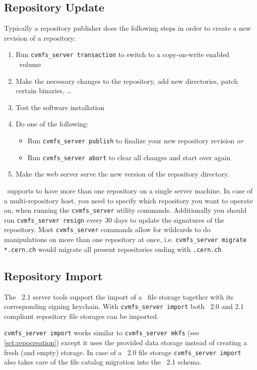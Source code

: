 \subsection{Repository Update}
\label{sct:repoupdateprocedure}
Typically a repository publisher does the following steps in order to create a new revision of a repository:
\begin{enumerate}
	\item Run \texttt{cvmfs\_server transaction} to switch to a copy-on-write enabled \cvmfs\ volume
	\item Make the necessary changes to the repository, \eg add new directories, patch certain binaries, \dots
	\item Test the software installation
	\item Do one of the following:
	\begin{itemize}
		\item Run \texttt{cvmfs\_server publish} to finalize your new repository revision \emph{or}
		\item Run \texttt{cvmfs\_server abort} to clear all changes and start over again
	\end{itemize}
	\item Make the web server serve the new version of the repository directory.
\end{enumerate}

\cvmfs\ supports to have more than one repository on a single server machine.
In case of a multi-repository host, you need to specify which repository you want to operate on, when running the \texttt{cvmfs\_server} utility commands.
Additionally you should run \texttt{cvmfs\_server resign} every 30 days to update the signatures of the repository.
Most \texttt{cvmfs\_server} commands allow for wildcards to do manipulations on more than one repository at once, i.e. \texttt{cvmfs\_server migrate *.cern.ch} would migrate all present repositories ending with \texttt{.cern.ch}.

\subsection{Repository Import}
The \cvmfs\ 2.1 server tools support the import of a \cvmfs\ file storage together with its corresponding signing keychain.
With \texttt{cvmfs\_server import} both \cvmfs\ 2.0 and 2.1 compliant repository file storages can be imported.

\texttt{cvmfs\_server import} works similar to \texttt{cvmfs\_server mkfs} (see \ref{sct:repocreation}) except it uses the provided data storage instead of creating a fresh (and empty) storage.
In case of a \cvmfs\ 2.0 file storage \texttt{cvmfs\_server import} also takes care of the file catalog migration into the \cvmfs\ 2.1 schema.

